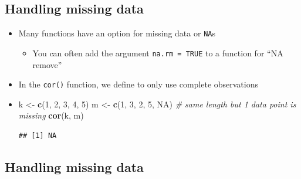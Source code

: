 \documentclass[
]{book}
\newenvironment{Shaded}{\begin{snugshade}}{\end{snugshade}}
\newcommand{\CommentTok}[1]{\textcolor[rgb]{0.56,0.35,0.01}{\textit{#1}}}
\newcommand{\ConstantTok}[1]{\textcolor[rgb]{0.56,0.35,0.01}{#1}}
\newcommand{\DecValTok}[1]{\textcolor[rgb]{0.00,0.00,0.81}{#1}}
\newcommand{\FunctionTok}[1]{\textcolor[rgb]{0.13,0.29,0.53}{\textbf{#1}}}
\newcommand{\NormalTok}[1]{#1}
\newcommand{\OtherTok}[1]{\textcolor[rgb]{0.56,0.35,0.01}{#1}}
\providecommand{\tightlist}{%
  \setlength{\itemsep}{0pt}\setlength{\parskip}{0pt}}
\begin{document}
\subsection{Handling missing data}\label{handling-missing-data}

\begin{itemize}
\item
  Many functions have an option for missing data or \texttt{NA}s

  \begin{itemize}
  \tightlist
  \item
    You can often add the argument \texttt{na.rm\ =\ TRUE} to a function for ``NA remove''
  \end{itemize}
\item
  In the \texttt{cor()} function, we define to only use complete observations
\item
\begin{Shaded}
\begin{Highlighting}[]
\NormalTok{k }\OtherTok{\textless{}{-}} \FunctionTok{c}\NormalTok{(}\DecValTok{1}\NormalTok{, }\DecValTok{2}\NormalTok{, }\DecValTok{3}\NormalTok{, }\DecValTok{4}\NormalTok{, }\DecValTok{5}\NormalTok{)}
\NormalTok{m }\OtherTok{\textless{}{-}} \FunctionTok{c}\NormalTok{(}\DecValTok{1}\NormalTok{, }\DecValTok{3}\NormalTok{, }\DecValTok{2}\NormalTok{, }\DecValTok{5}\NormalTok{, }\ConstantTok{NA}\NormalTok{) }\CommentTok{\# same length but 1 data point is missing}
\FunctionTok{cor}\NormalTok{(k, m)}
\end{Highlighting}
\end{Shaded}

\begin{verbatim}
## [1] NA
\end{verbatim}
\end{itemize}

\subsection{Handling missing data}\label{handling-missing-data-1}
\end{document}
